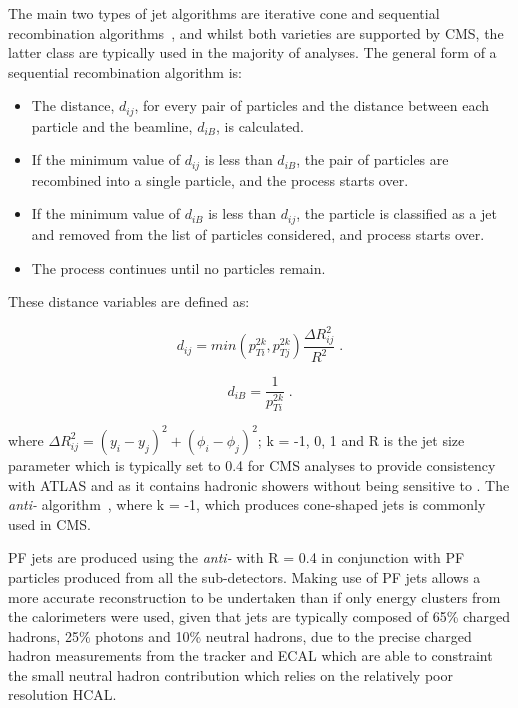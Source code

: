 {The main two types of jet algorithms are iterative cone and sequential recombination algorithms~\cite{Salam:2009jx}, and whilst both varieties are supported by CMS, the latter class are typically used in the majority of analyses.
The general form of a sequential recombination algorithm is:
\begin{itemize}
\item The distance, $d_{ij}$, for every pair of particles and the distance between each particle and the beamline, $d_{iB}$, is calculated.
\item If the minimum value of $d_{ij}$ is less than $d_{iB}$, the pair of particles are recombined into a single particle, and the process starts over.
\item If the minimum value of $d_{iB}$ is less than $d_{ij}$, the particle is classified as a jet and removed from the list of particles considered, and process starts over.
\item The process continues until no particles remain.
\end{itemize}

These distance variables are defined as:

\begin{equation}
d_{ij} = min(p^{2k}_{Ti},p^{2k}_{Tj}) \frac{\Delta R^{2}_{ij}}{R^{2}} \;.
\label{eq:jetAlgo1}
\end{equation}

\begin{equation}
d_{iB} = \frac{1}{p^{2k}_{Ti}} \;.
\label{eq:jetAlgo2}
\end{equation}

where $\Delta R^{2}_{ij} = (y_{i} - y_{j})^{2} + (\phi_{i} - \phi_{j})^{2}$; k = -1, 0, 1 and R is the jet size parameter which is typically set to 0.4 for CMS analyses to provide consistency with ATLAS and as it contains hadronic showers without being sensitive to \PU.
The \emph{anti-\kt} algorithm~\cite{Cacciari:2008gp}, where k = -1, which produces cone-shaped jets is commonly used in CMS.

PF jets are produced using the \emph{anti-\kt} with R = 0.4 in conjunction with PF particles produced from all the sub-detectors.
Making use of PF jets allows a more accurate reconstruction to be undertaken than if only energy clusters from the calorimeters were used, given that jets are typically composed of 65\% charged hadrons, 25\% photons and 10\% neutral hadrons, due to the precise charged hadron measurements from the tracker and ECAL which are able to constraint the small neutral hadron contribution which relies on the relatively poor resolution HCAL.

}
